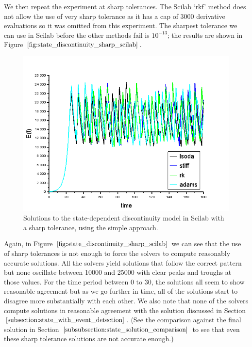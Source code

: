 We then repeat the experiment at sharp tolerances. The Scilab `rkf' method does not allow the use of very sharp tolerance as it has a cap of 3000 derivative evaluations so it was omitted from this experiment. The sharpest tolerance we can use in Scilab before the other methods fail is $10^{-13}$; the results are shown in Figure $\ref{fig:state_discontinuity_sharp_scilab}$.

\begin{figure}[H]
\centering
\includegraphics[width=0.7\linewidth]{./figures/state_discontinuity_sharp_sci}
\caption{Solutions to the state-dependent discontinuity model in Scilab with a sharp tolerance, using the simple approach.}
\label{fig:state_discontinuity_sharp_scilab}
\end{figure}

Again, in Figure $\ref{fig:state_discontinuity_sharp_scilab}$ we can see that the use of sharp tolerances is not enough to force the solvers to compute reasonably accurate solutions. All the solvers yield solutions that follow the correct pattern but none oscillate between 10000 and 25000 with clear peaks and troughs at those values. For the time period between 0 to 30, the solutions all seem to show reasonable agreement but as we go further in time, all of the solutions start to disagree more substantially with each other. We also note that none of the solvers compute solutions in reasonable agreement with the solution discussed in Section $\ref{subsection:state_with_event_detection}$. (See the comparison against the final solution in Section $\ref{subsubsection:state_solution_comparison}$ to see that even these sharp tolerance solutions are not accurate enough.)


